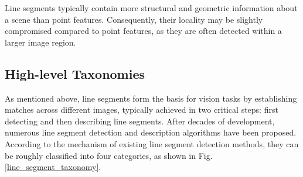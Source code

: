 \documentclass[journal,compsoc]{IEEEtran}
\begin{document}
Line segments typically contain more structural and geometric information about a scene than point features. Consequently, their locality \cite{local_feature} may be slightly compromised compared to point features, as they are often detected within a larger image region.

\subsection{High-level Taxonomies}
\label{subsec_high_level_taxonomy}
As mentioned above, line segments form the basis for vision tasks by establishing matches across different images, typically achieved in two critical steps: first detecting and then describing line segments. After decades of development, numerous line segment detection and description algorithms have been proposed. According to the mechanism of existing line segment detection methods, they can be roughly classified into four categories, as shown in Fig. \ref{line_segment_taxonomy}.
\end{document}
